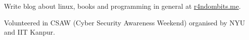 \documentclass[11pt, a4paper]{cv}
\begin{document}

\begin{cventries}
        \begin{cvitems}
        \item {Write blog about linux, books and programming in general at \href{http://r4ndombits.me}{r4ndombits.me}.}
        \item {Volunteered in CSAW (Cyber Security Awareness Weekend) organised by NYU and IIT Kanpur.}
        \end{cvitems}
\end{cventries}

\end{document}
